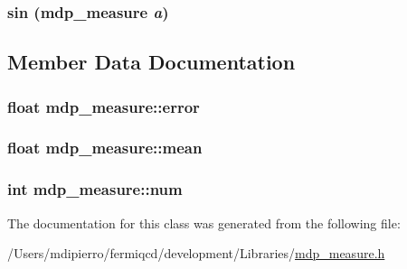\label{classmdp__measure_a2974468f862cb8c3fe0a0034a4bd2e08}
\hypertarget{classmdp__measure_a7889df6f1c1f8cfd6cb9aa0a3f9a2ec9}{
\subsubsection[{sin}]{ sin ({\bf mdp\_\-measure} {\em a})}}
\label{classmdp__measure_a7889df6f1c1f8cfd6cb9aa0a3f9a2ec9}


\subsection{Member Data Documentation}
\hypertarget{classmdp__measure_ac0e564a7fdfa4785e8ca77569a2c37e4}{
\subsubsection[{error}]{\setlength{\rightskip}{0pt plus 5cm}float {\bf mdp\_\-measure::error}}}
\label{classmdp__measure_ac0e564a7fdfa4785e8ca77569a2c37e4}
\hypertarget{classmdp__measure_a105996437f8864a761c17dfa308a73f0}{
\subsubsection[{mean}]{\setlength{\rightskip}{0pt plus 5cm}float {\bf mdp\_\-measure::mean}}}
\label{classmdp__measure_a105996437f8864a761c17dfa308a73f0}
\hypertarget{classmdp__measure_aca5ab38b4f8c43639b2754947c4e4b25}{
\subsubsection[{num}]{\setlength{\rightskip}{0pt plus 5cm}int {\bf mdp\_\-measure::num}}}
\label{classmdp__measure_aca5ab38b4f8c43639b2754947c4e4b25}


The documentation for this class was generated from the following file:\begin{DoxyCompactItemize}
\item 
/Users/mdipierro/fermiqcd/development/Libraries/\hyperlink{mdp__measure_8h}{mdp\_\-measure.h}\end{DoxyCompactItemize}
